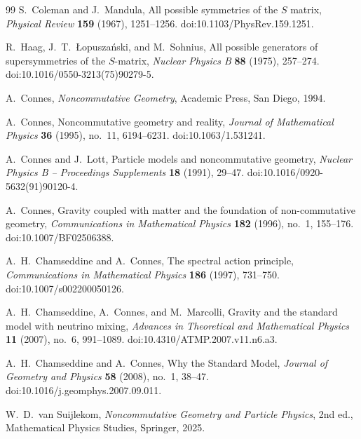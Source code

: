 \documentclass[11pt]{article}
\numberwithin{equation}{section}
\theoremstyle{definition}
\theoremstyle{remark}
\begin{document}
\begin{thebibliography}{99}
S.~Coleman and J.~Mandula,
\newblock All possible symmetries of the $S$ matrix,
\newblock \emph{Physical Review} \textbf{159} (1967), 1251--1256.
\newblock doi:10.1103/PhysRev.159.1251.

R.~Haag, J.~T.~\L opusza\'nski, and M.~Sohnius,
\newblock All possible generators of supersymmetries of the $S$-matrix,
\newblock \emph{Nuclear Physics B} \textbf{88} (1975), 257--274.
\newblock doi:10.1016/0550-3213(75)90279-5.

A.~Connes,
\newblock \emph{Noncommutative Geometry},
\newblock Academic Press, San Diego, 1994.

A.~Connes,
\newblock Noncommutative geometry and reality,
\newblock \emph{Journal of Mathematical Physics} \textbf{36} (1995), no.~11,
6194--6231.
\newblock doi:10.1063/1.531241.

A.~Connes and J.~Lott,
\newblock Particle models and noncommutative geometry,
\newblock \emph{Nuclear Physics B -- Proceedings Supplements} \textbf{18} (1991),
29--47.
\newblock doi:10.1016/0920-5632(91)90120-4.

A.~Connes,
\newblock Gravity coupled with matter and the foundation of non-commutative
geometry,
\newblock \emph{Communications in Mathematical Physics} \textbf{182} (1996),
no.~1, 155--176.
\newblock doi:10.1007/BF02506388.

A.~H.~Chamseddine and A.~Connes,
\newblock The spectral action principle,
\newblock \emph{Communications in Mathematical Physics} \textbf{186} (1997),
731--750.
\newblock doi:10.1007/s002200050126.

A.~H.~Chamseddine, A.~Connes, and M.~Marcolli,
\newblock Gravity and the standard model with neutrino mixing,
\newblock \emph{Advances in Theoretical and Mathematical Physics}
\textbf{11} (2007), no.~6, 991--1089.
\newblock doi:10.4310/ATMP.2007.v11.n6.a3.

A.~H.~Chamseddine and A.~Connes,
\newblock Why the Standard Model,
\newblock \emph{Journal of Geometry and Physics} \textbf{58} (2008), no.~1,
38--47.
\newblock doi:10.1016/j.geomphys.2007.09.011.

W.~D.~van Suijlekom,
\newblock \emph{Noncommutative Geometry and Particle Physics},
\newblock 2nd ed., Mathematical Physics Studies, Springer, 2025.


\end{thebibliography}
\end{document}
